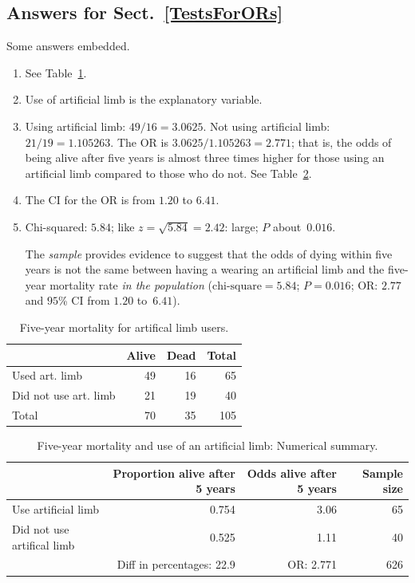 \documentclass[
  11pt,
  a4paper,
  krantz2]{krantz}
\providecommand{\tightlist}{%
  \setlength{\itemsep}{0pt}\setlength{\parskip}{0pt}}
\begin{document}
\begin{footnotesize}
\subsection*{Answers for Sect.~\ref{TestsForORs}}\label{answers-for-sect.-reftestsforors}

Some answers embedded.

\begin{enumerate}
\def\labelenumi{\arabic{enumi}.}
\item
  See Table~\ref{tab:ArtLimbMortalityANS}. \tightlist
\item
  Use of artificial limb is the explanatory variable.
\item
  Using artificial limb: \(49/16 = 3.0625\).
  Not using artificial limb: \(21/19 = 1.105263\).
  The OR is \(3.0625/1.105263 = 2.771\); that is, the odds of being alive after five years is almost three times higher for those using an artificial limb compared to those who do not.
  See Table~\ref{tab:ArtLimbSummaryANS}.
\item
  The CI for the OR is from \(1.20\) to \(6.41\).
\item
  Chi-squared: \(5.84\); like \(z = \sqrt{5.84} = 2.42\): large; \(P\) about~\(0.016\).

  The \emph{sample} provides evidence to suggest that the odds of dying within five years is not the same between having a wearing an artificial limb and the five-year mortality rate \emph{in the population} (\(\text{chi-square} = 5.84\); \(P = 0.016\); OR: \(2.77\) and \(95\)\% CI from \(1.20\) to~\(6.41\)).
\end{enumerate}

\begin{table}
\centering
\caption{\label{tab:ArtLimbMortalityANS}Five-year mortality for artifical limb users.}
\centering
\fontsize{8}{10}\selectfont
\begin{tabular}[t]{lrrr}
\toprule
\textbf{ } & \textbf{Alive} & \textbf{Dead} & \textbf{Total}\\
\midrule
Used art. limb & 49 & 16 & 65\\
Did not use art. limb & 21 & 19 & 40\\
\midrule
Total & 70 & 35 & 105\\
\bottomrule
\end{tabular}
\end{table}

\begin{table}
\centering
\caption{\label{tab:ArtLimbSummaryANS}Five-year mortality and use of an artificial limb: Numerical summary.}
\centering
\fontsize{8}{10}\selectfont
\begin{tabular}[t]{lrrr}
\toprule
\textbf{ } & \textbf{Proportion alive after 5 years} & \textbf{Odds alive after 5 years} & \textbf{Sample size}\\
\midrule
Use artificial limb & 0.754 & 3.06 & 65\\
Did not use artifical limb & 0.525 & 1.11 & 40\\
\midrule
 & Diff in percentages: 22.9 & OR: 2.771 & 626\\
\bottomrule
\end{tabular}
\end{table}


\end{footnotesize}
\end{document}
